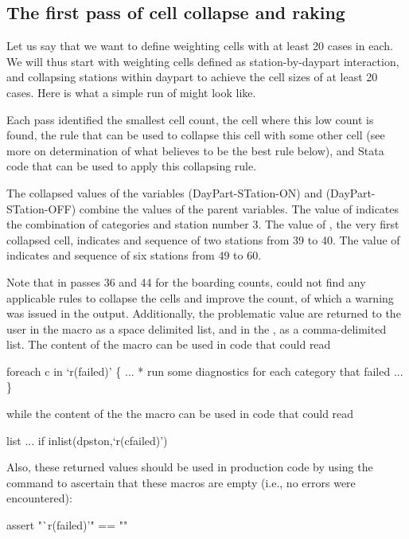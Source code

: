\subsection{The first pass of cell collapse and raking}

Let us say that we want to define weighting cells with at least 20 cases in each.
We will thus start with weighting cells defined as station-by-daypart interaction,
and collapsing stations within daypart to achieve the cell sizes of at least 20 cases.
Here is what a simple run of  might look like.

\cnp

\begin{stlog}
\nullskip
\end{stlog}

Each pass identified the smallest cell count, the cell where this low count is found,
the rule that can be used to collapse this cell with some other cell (see more on determination
of what  believes to be the best rule below), and Stata code
that can be used to apply this collapsing rule. 

The collapsed values of the variables  (DayPart-STation-ON) and
 (DayPart-STation-OFF) combine the values of the parent variables. The value
of  indicates the combination of categories 
 and station number 3.
\label{page:dpston:nomenclature}
The value of , the very first collapsed cell, indicates
 and sequence of two stations from 39 to 40.
The value of  indicates  and sequence of
six stations from 49 to 60.

Note that in passes 36 and 44 for the boarding counts, 
could not find any applicable rules to collapse the cells and improve the count,
of which a warning was issued in the output. Additionally, the problematic value are returned to the user
in the  macro as a space delimited list, and in the , as a comma-delimited list.
The content of the  macro can be used in code that could read

\begin{stlog}
foreach c in `r(failed)' \{
    ...
    * run some diagnostics for each category that failed
    ...
\}
\end{stlog}
while the content of the the  macro can be used in code that could
read 
\begin{stlog}
list ... if inlist(dpston,`r(cfailed)')
\end{stlog}
Also, these returned values should be used in production code by using the  command
\citep{gould:2003:tip3} to ascertain that these macros are empty (i.e., no errors
were encountered):
\begin{stlog}
assert "`r(failed)'" == ""
\end{stlog}

